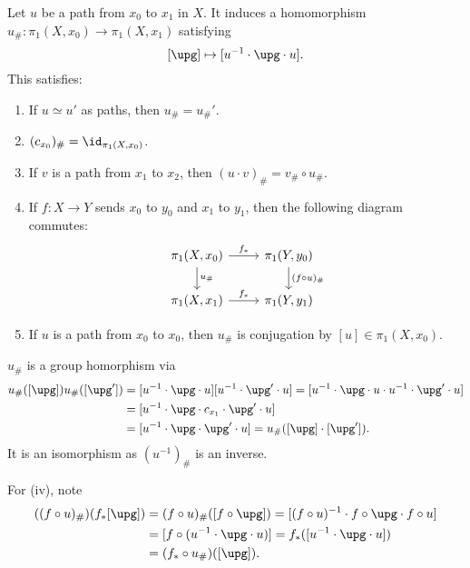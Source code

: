 \documentclass[12pt]{article}
\begin{document}
\begin{proposition}
	Let $u$ be a path from $x_0$ to $x_1$ in $X$. It induces a homomorphism $u_{\#} : \pi_1(X, x_0) \to \pi_1(X, x_1)$ satisfying
	\[
		[\upg] \mapsto [u^{-1} \cdot \upg \cdot u].
	\]
	This satisfies:
	\begin{enumerate}[\normalfont(i)]
		\item If $u \simeq u'$ as paths, then $u_{\#} = u_{\#}'$.
		\item $(c_{x_0})_{\#} = \id_{\pi_1(X, x_0)}$.
		\item If $v$ is a path from $x_1$ to $x_2$, then $(u \cdot v)_{\#} = v_{\#} \circ u_{\#}$.
		\item If $f : X \to Y$ sends $x_0$ to $y_0$ and $x_1$ to $y_1$, then the following diagram commutes:
			\[
			\begin{tikzcd}
				\pi_1(X, x_0) \arrow[r, "f_\ast"] \arrow[d, "u_{\#}"] & \pi_1(Y, y_0) \arrow[d, "(f \circ u)_{\#}"] \\
				\pi_1(X, x_1) \arrow[r, "f_\ast"] & \pi_1(Y, y_1)
			\end{tikzcd}
			\]
		\item If $u$ is a path from $x_0$ to $x_0$, then $u_{\#}$ is conjugation by $[u] \in \pi_1(X, x_0)$.
	\end{enumerate}
\end{proposition}

\begin{proofbox}
	$u_{\#}$ is a group homorphism via
	\begin{align*}
		u_{\#}([\upg]) u_{\#}([\upg']) &= [u^{-1} \cdot \upg \cdot u] [u^{-1} \cdot \upg' \cdot u] = [u^{-1} \cdot \upg \cdot u \cdot u^{-1} \cdot \upg' \cdot u] \\
					       &= [u^{-1} \cdot \upg \cdot c_{x_1} \cdot \upg' \cdot u] \\
					       &= [u^{-1} \cdot \upg \cdot \upg' \cdot u] = u_{\#}([\upg] \cdot [\upg']).
	\end{align*}
	It is an isomorphism as $(u^{-1})_{\#}$ is an inverse.

	For (iv), note
	\begin{align*}
		((f \circ u)_{\#})(f_\ast[\upg]) &= (f \circ u)_{\#}([f \circ \upg]) = [(f \circ u)^{-1} \cdot f \circ \upg \cdot f \circ u] \\
					   &= [f \circ (u^{-1} \cdot \upg \cdot u)] = f_\ast([u^{-1} \cdot \upg \cdot u]) \\
					   &= (f_\ast \circ u_{\#})([\upg]).
	\end{align*}
\end{proofbox}
\end{document}
